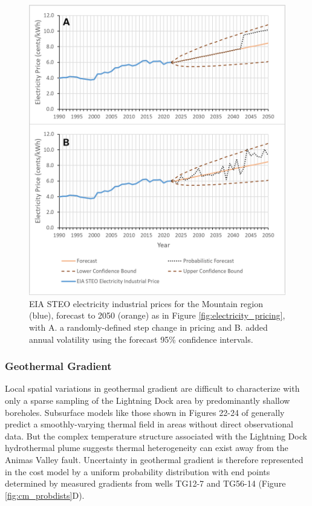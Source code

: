 \begin{figure}[htp]
\centering
\includegraphics[width=.85\textwidth]{templates/images/Figure-ElectPrice_Prob.png}
\singlespacing
\caption[Cost model probabilistic price forecasts]{EIA STEO electricity industrial prices for the Mountain region (blue), forecast to 2050 (orange) as in Figure \ref{fig:electricity_pricing}, with A. a randomly-defined step change in pricing and B. added annual volatility using the forecast 95\% confidence intervals.}
\label{fig:elec_price_prob}
\end{figure}

\subsubsection{Geothermal Gradient}\label{cm4:prob_gradient}
Local spatial variations in geothermal gradient are difficult to characterize with only a sparse sampling of the Lightning Dock area by predominantly shallow boreholes. Subsurface models like those shown in Figures 22-24 of \citep{cunniff_final_2005} generally predict a smoothly-varying thermal field in areas without direct observational data. But the complex temperature structure associated with the Lightning Dock hydrothermal plume suggests thermal heterogeneity can exist away from the Animas Valley fault. Uncertainty in geothermal gradient is therefore represented in the cost model by a uniform probability distribution with end points determined by measured gradients from wells TG12-7 and TG56-14 (Figure \ref{fig:cm_probdists}D).

